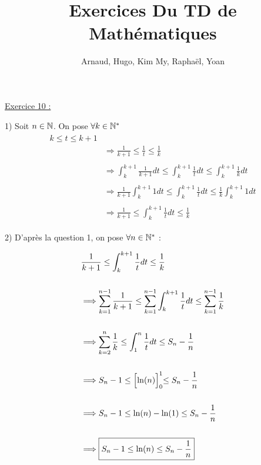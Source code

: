 \documentclass{article}
\title{Exercices Du TD de Mathématiques}
\author{Arnaud, Hugo, Kim My, Raphaël, Yoan}
\begin{document}
\maketitle

\underline{Exercice 10 :}

\bigskip
\bigskip
\bigskip

\footnotesize

1) Soit $n\in\mathbb{N}$. On pose $\forall k\in\mathbb{N}^*$
\begin{align}
\begin{split}
k\leq t\leq k+1\\
&\Longrightarrow \frac{1}{k+1}\leq\frac{1}{t}\leq\frac{1}{k}\\\\
&\Longrightarrow \int^{k+1}_k\frac{1}{k+1}dt\leq\int^{k+1}_k\frac{1}{t}dt\leq\int^{k+1}_k\frac{1}{k}dt\\\\
&\Longrightarrow \frac{1}{k+1}\int^{k+1}_k1dt\leq\int^{k+1}_k\frac{1}{t}dt\leq\frac{1}{k}\int^{k+1}_k1dt\\\\
&\Longrightarrow\boxed{\frac{1}{k+1}\leq\int^{k+1}_k\frac{1}{t}dt\leq\frac{1}{k}}
\end{split}
\end{align}

\bigskip
\bigskip
\bigskip

2) D'après la question 1, on pose $\forall n\in\mathbb{N}^*$ :

\begin{align}
\begin{split}
&\frac{1}{k+1}\leq\int^{k+1}_k\frac{1}{t}dt\leq\frac{1}{k}\\\\
&\Longrightarrow \sum^{n-1}_{k=1}\frac{1}{k+1}\leq\sum^{n-1}_{k=1}\int^{k+1}_k\frac{1}{t}dt\leq\sum^{n-1}_{k=1}\frac{1}{k}\\\\
&\Longrightarrow \sum^{n}_{k=2}\frac{1}{k}\leq\int^n_1\frac{1}{t}dt\leq S_n-\frac{1}{n}\\\\
&\Longrightarrow S_n-1\leq\Bigl[\ln(n)\Bigl]^1_0\leq S_n-\frac{1}{n}\\\\
&\Longrightarrow S_n-1\leq \ln(n)-\ln(1)\leq S_n-\frac{1}{n}\\\\
&\Longrightarrow\boxed{S_n-1\leq \ln(n)\leq S_n-\frac{1}{n}}
\end{split}
\end{align}
\end{document}
